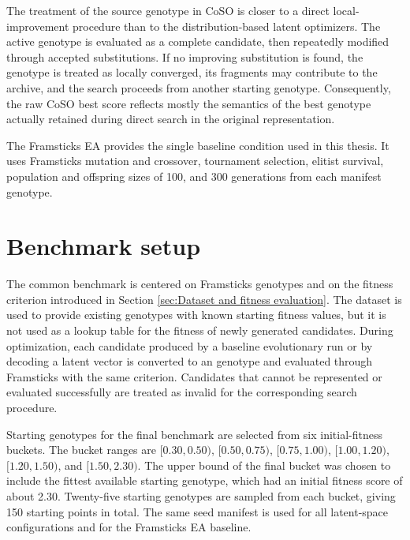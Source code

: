 The treatment of the source genotype in CoSO is closer to a direct local-improvement procedure than to the distribution-based latent optimizers. The active genotype is evaluated as a complete \fone{} candidate, then repeatedly modified through accepted substitutions. If no improving substitution is found, the genotype is treated as locally converged, its fragments may contribute to the archive, and the search proceeds from another starting genotype. Consequently, the raw CoSO best score reflects mostly the semantics of the best genotype actually retained during direct search in the original representation.

The Framsticks EA provides the single baseline condition used in this thesis. It uses Framsticks mutation and crossover, tournament selection, elitist survival, population and offspring sizes of 100, and 300 generations from each manifest genotype.



\section{Benchmark setup}
\label{sec:Benchmark setup}


The common benchmark is centered on Framsticks \fone{} genotypes and on the \vertpos{} fitness criterion introduced in Section \ref{sec:Dataset and fitness evaluation}. The dataset is used to provide existing genotypes with known starting fitness values, but it is not used as a lookup table for the fitness of newly generated candidates. During optimization, each candidate produced by a baseline evolutionary run or by decoding a latent vector is converted to an \fone{} genotype and evaluated through Framsticks with the same \vertpos{} criterion. Candidates that cannot be represented or evaluated successfully are treated as invalid for the corresponding search procedure.

Starting genotypes for the final benchmark are selected from six initial-fitness buckets. The bucket ranges are \([0.30,0.50)\), \([0.50,0.75)\), \([0.75,1.00)\), \([1.00,1.20)\), \([1.20,1.50)\), 
and \([1.50, 2.30)\).
The upper bound of the final bucket was chosen to include the fittest available starting genotype, which had an initial fitness score of about 2.30. 
Twenty-five starting genotypes are sampled from each bucket, giving 150 starting points in total. The same seed manifest is used for all latent-space configurations and for the Framsticks EA baseline.

